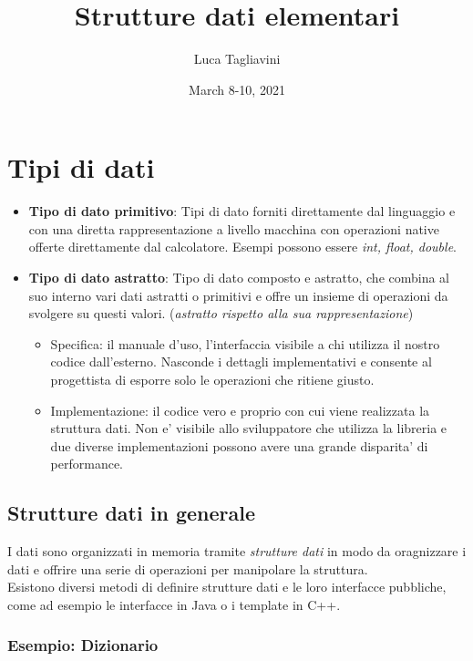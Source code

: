 \documentclass{article}
\title{\textbf{Strutture dati elementari}}
\author{Luca Tagliavini}
\date{March 8-10, 2021}
\begin{document}
\maketitle
\tableofcontents
\pagebreak

\section{Tipi di dati}

\begin{itemize}
  \item \textbf{Tipo di dato primitivo}: Tipi di dato forniti direttamente dal
    linguaggio e con una diretta rappresentazione a livello macchina con operazioni
    native offerte direttamente dal calcolatore. Esempi possono essere \emph{int, float, double}.
  \item \textbf{Tipo di dato astratto}: Tipo di dato composto e astratto, che combina
    al suo interno vari dati astratti o primitivi e offre un insieme di operazioni da
    svolgere su questi valori. (\emph{astratto rispetto alla sua rappresentazione})
    \begin{itemize}
      \item Specifica: il manuale d'uso, l'interfaccia visibile a chi utilizza
        il nostro codice dall'esterno. Nasconde i dettagli implementativi e
        consente al progettista di esporre solo le operazioni che ritiene giusto.
      \item Implementazione: il codice vero e proprio con cui viene realizzata la
        struttura dati. Non e' visibile allo sviluppatore che utilizza la libreria
        e due diverse implementazioni possono avere una grande disparita' di performance.
    \end{itemize}
\end{itemize}

\subsection{Strutture dati in generale}

I dati sono organizzati in memoria tramite \emph{strutture dati} in modo da oragnizzare
i dati e offrire una serie di operazioni per manipolare la struttura. \\
Esistono diversi metodi di definire strutture dati e le loro interfacce pubbliche, come
ad esempio le interfacce in Java o i template in C++.

\subsubsection{Esempio: Dizionario}
\end{document}
